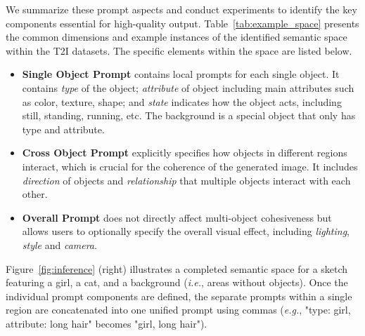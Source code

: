 We summarize these prompt aspects and conduct experiments to identify the key components essential for high-quality output. 
Table~\ref{tab:example_space} presents the common dimensions and example instances of the identified semantic space within the T2I datasets.
The specific elements within the space are listed below.
\begin{itemize}
    \item \textbf{Single Object Prompt} contains local prompts for each single object. 
    It contains \textit{type} of the object; \textit{attribute} of object including main attributes such as color, texture, shape; and \textit{state} indicates how the object acts, including still, standing, running, etc. The background is a special object that only has type and attribute.
    \item \textbf{Cross Object Prompt} explicitly specifies how objects in different regions interact, which is crucial for the coherence of the generated image.
    It includes \textit{direction} of objects and \textit{relationship} that multiple objects interact with each other.
    \item \textbf{Overall Prompt} does not directly affect multi-object cohesiveness but allows users to optionally specify the overall visual effect, including \textit{lighting}, \textit{style} and \textit{camera}.
\end{itemize}




Figure~\ref{fig:inference} (right) illustrates a completed semantic space for a sketch featuring a girl, a cat, and a background (\textit{i.e.}, areas without objects).
Once the individual prompt components are defined, the separate prompts within a single region are concatenated into one unified prompt using commas (\textit{e.g.}, "type: girl, attribute: long hair" becomes "girl, long hair"). 



